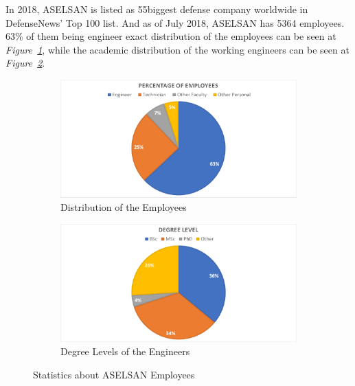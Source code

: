 	In 2018, ASELSAN is listed as 55\nth biggest defense company worldwide in DefenseNews' Top 100 list\cite{defense}. And as of July 2018, ASELSAN has 5364 employees. 63\% of them being engineer exact distribution of the employees can be seen at \textit{Figure~\ref{fig:calisan}}, while the academic distribution of the working engineers can be seen at \textit{Figure~\ref{fig:degree}}.





\begin{figure}[H]
	\setlength{\unitlength}{\textwidth} 
	\centering
	\begin{subfigure}{.5\textwidth}
  		\centering
  		\includegraphics[width=0.48\unitlength]{calisan}
  		\caption{\label{fig:calisan}Distribution of the Employees }
	\end{subfigure}%
	\begin{subfigure}{.5\textwidth}
  		\centering
		\includegraphics[width=0.48\unitlength]{degree}
  		\caption{\label{fig:degree}Degree Levels of the Engineers }
	\end{subfigure}
\caption{\label{fig:calisandegree} Statistics about ASELSAN Employees   }
\end{figure}


